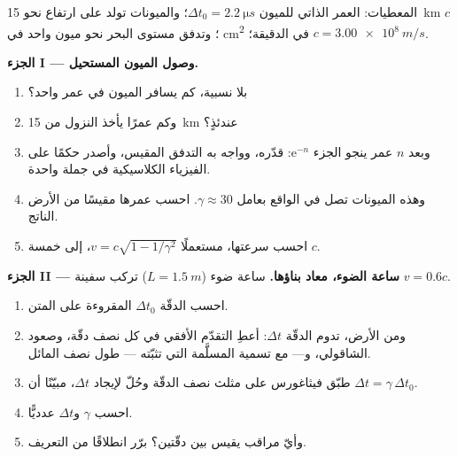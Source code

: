 \begin{problem}
\label{pb:g12:special-relativity:1}
المعطيات: العمر الذاتي للميون $\Delta t_0 = \qty{2.2}{\micro s}$؛ والميونات تولد
على ارتفاع نحو \qty{15}{km}   $c$؛ وتدفق مستوى البحر نحو ميون واحد في
\unit{cm^2} في الدقيقة؛ $c = \qty{3.00e8}{m/s}$.

\medskip
\noindent\textbf{الجزء I --- وصول الميون المستحيل.}
\begin{enumerate}
  \item بلا نسبية، كم يسافر الميون في عمر واحد؟
  \item وكم عمرًا يأخذ النزول من \qty{15}{km} عندئذٍ؟
  \item وبعد $n$ عمر ينجو الجزء $\mathrm{e}^{-n}$:
        قدّره، وواجه به التدفق المقيس، وأصدر حكمًا على
        الفيزياء الكلاسيكية في جملة واحدة.
  \item وهذه الميونات تصل في الواقع بعامل $\gamma \approx 30$. احسب
        عمرها مقيسًا من الأرض  الناتج.
  \item احسب سرعتها، مستعملًا $v = c\sqrt{1 - 1/\gamma^2}$، إلى خمسة
          $c$.
\end{enumerate}

\medskip
\noindent\textbf{الجزء II --- ساعة الضوء، معاد بناؤها.}
ساعة ضوء ($L = \qty{1.5}{m}$) تركب سفينة  $v = 0.6c$.
\begin{enumerate}[resume]
  \item احسب الدقّة $\Delta t_0$ المقروءة على المتن.
  \item ومن الأرض، تدوم الدقّة $\Delta t$: أعطِ التقدّم الأفقي
        في كل نصف دقّة، وصعود  الشاقولي، و--- مع تسمية
        المسلَّمة التي تثبّته --- طول نصف  المائل.
  \item طبّق فيثاغورس على مثلث نصف الدقّة وحُلّ لإيجاد
        $\Delta t$، مبيّنًا أن $\Delta t = \gamma\,\Delta t_0$.
  \item احسب $\gamma$ و$\Delta t$ عدديًّا.
  \item وأيّ مراقب يقيس  بين دقّتين؟ برّر
        انطلاقًا من التعريف.
\end{enumerate}


\end{problem}
